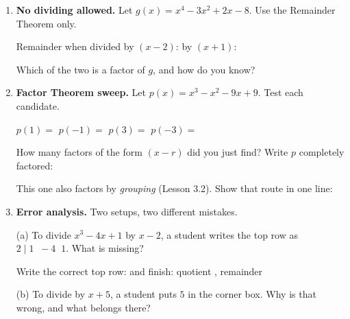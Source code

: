 \documentclass[10pt]{article}
\begin{document}
\begin{tcolorbox}[colback=white, colframe=black!40, title=\textbf{Tier A --- Approaching Proficiency},
    fonttitle=\bfseries, arc=1.5mm, left=3mm, right=3mm, top=2mm, bottom=2mm, breakable]
\begin{enumerate}[leftmargin=1.7em, itemsep=10pt]
    \vspace{2pt}
    The three zeros are  \; --- one of them is \emph{not} an integer. Which?

  \item \textbf{No dividing allowed.} Let $g(x) = x^4 - 3x^2 + 2x - 8$. Use the Remainder Theorem
    only.

    \vspace{2pt}
    Remainder when divided by $(x-2)$:  \qquad by $(x+1)$: 

    \vspace{2pt}
    Which of the two is a factor of $g$, and how do you know? 

  \item \textbf{Factor Theorem sweep.} Let $p(x) = x^3 - x^2 - 9x + 9$. Test each candidate.

    \vspace{2pt}
    $p(1) = $  \quad $p(-1) = $  \quad $p(3) = $  \quad
    $p(-3) = $ 

    \vspace{2pt}
    How many factors of the form $(x-r)$ did you just find?  \;
    Write $p$ completely factored: 

    \vspace{2pt}
    This one also factors by \emph{grouping} (Lesson 3.2). Show that route in one line:

  \item \textbf{Error analysis.} Two setups, two different mistakes.

    \vspace{2pt}
    (a) To divide $x^3 - 4x + 1$ by $x - 2$, a student writes the top row as \; $2 \mid 1 \;\; -4
    \;\; 1$. \; What is missing? 

    \vspace{2pt}
    Write the correct top row:  \; and finish: quotient , remainder

    \vspace{2pt}
    (b) To divide by $x + 5$, a student puts $5$ in the corner box. Why is that wrong, and what
    belongs there? 
\end{enumerate}
\end{tcolorbox}
\end{document}
